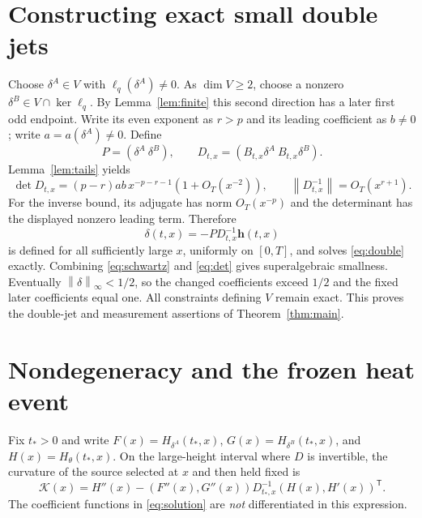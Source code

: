 \documentclass[11pt]{article}
\theoremstyle{remark}\newtheorem{remark}[theorem]{Remark}
\newcommand{\norm}[1]{\left\lVert #1\right\rVert}
\newcommand{\thetaH}{H_\theta}
\newcommand{\jet}{\mathbf h}
\begin{document}
\section{Constructing exact small double jets}
Choose $\delta^A\in V$ with $\ell_q(\delta^A)\ne0$. As $\dim V\ge2$, choose a nonzero $\delta^B\in V\cap\ker\ell_q$. By Lemma~\ref{lem:finite} this second direction has a later first odd endpoint. Write its even exponent as $r>p$ and its leading coefficient as $b\ne0$; write $a=a(\delta^A)\ne0$. Define
\[
 P=(\delta^A\ \delta^B),\qquad D_{t,x}=(B_{t,x}\delta^A\ B_{t,x}\delta^B).
\]
Lemma~\ref{lem:tails} yields
\begin{equation}\label{eq:det}
 \det D_{t,x}=(p-r)ab\,x^{-p-r-1}(1+O_T(x^{-2})),\qquad
 \norm{D_{t,x}^{-1}}=O_T(x^{r+1}).
\end{equation}
For the inverse bound, its adjugate has norm $O_T(x^{-p})$ and the determinant has the displayed nonzero leading term. Therefore
\begin{equation}\label{eq:solution}
 \delta(t,x)=-P D_{t,x}^{-1}\jet(t,x)
\end{equation}
is defined for all sufficiently large $x$, uniformly on $[0,T]$, and solves \eqref{eq:double} exactly. Combining \eqref{eq:schwartz} and \eqref{eq:det} gives superalgebraic smallness. Eventually $\norm\delta_\infty<1/2$, so the changed coefficients exceed $1/2$ and the fixed later coefficients equal one. All constraints defining $V$ remain exact. This proves the double-jet and measurement assertions of Theorem~\ref{thm:main}.

\section{Nondegeneracy and the frozen heat event}\label{sec:nondegenerate}
Fix $t_*>0$ and write $F(x)=H_{\delta^A}(t_*,x)$, $G(x)=H_{\delta^B}(t_*,x)$, and $H(x)=\thetaH(t_*,x)$. On the large-height interval where $D$ is invertible, the curvature of the source selected at $x$ and then held fixed is
\begin{equation}\label{eq:curvature}
 \mathcal K(x)=H''(x)-(F''(x),G''(x))D_{t_*,x}^{-1}(H(x),H'(x))^{\mathsf T}.
\end{equation}
The coefficient functions in \eqref{eq:solution} are \emph{not} differentiated in this expression.
\end{document}
